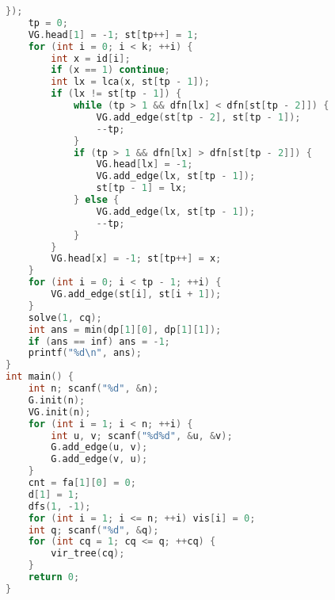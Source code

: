 \begin{lstlisting}[language=C++]
    });
    tp = 0;
    VG.head[1] = -1; st[tp++] = 1;
    for (int i = 0; i < k; ++i) {
        int x = id[i];
        if (x == 1) continue;
        int lx = lca(x, st[tp - 1]);
        if (lx != st[tp - 1]) {
            while (tp > 1 && dfn[lx] < dfn[st[tp - 2]]) {
                VG.add_edge(st[tp - 2], st[tp - 1]);
                --tp;
            }
            if (tp > 1 && dfn[lx] > dfn[st[tp - 2]]) {
                VG.head[lx] = -1;
                VG.add_edge(lx, st[tp - 1]);
                st[tp - 1] = lx;
            } else {
                VG.add_edge(lx, st[tp - 1]);
                --tp;
            }
        }
        VG.head[x] = -1; st[tp++] = x;
    }
    for (int i = 0; i < tp - 1; ++i) {
        VG.add_edge(st[i], st[i + 1]);
    }
    solve(1, cq);
    int ans = min(dp[1][0], dp[1][1]);
    if (ans == inf) ans = -1;
    printf("%d\n", ans);
}
int main() {
    int n; scanf("%d", &n);
    G.init(n);
    VG.init(n);
    for (int i = 1; i < n; ++i) {
        int u, v; scanf("%d%d", &u, &v);
        G.add_edge(u, v);
        G.add_edge(v, u);
    }
    cnt = fa[1][0] = 0;
    d[1] = 1;
    dfs(1, -1);
    for (int i = 1; i <= n; ++i) vis[i] = 0;
    int q; scanf("%d", &q);
    for (int cq = 1; cq <= q; ++cq) {
        vir_tree(cq);
    }
    return 0;
}
\end{lstlisting}